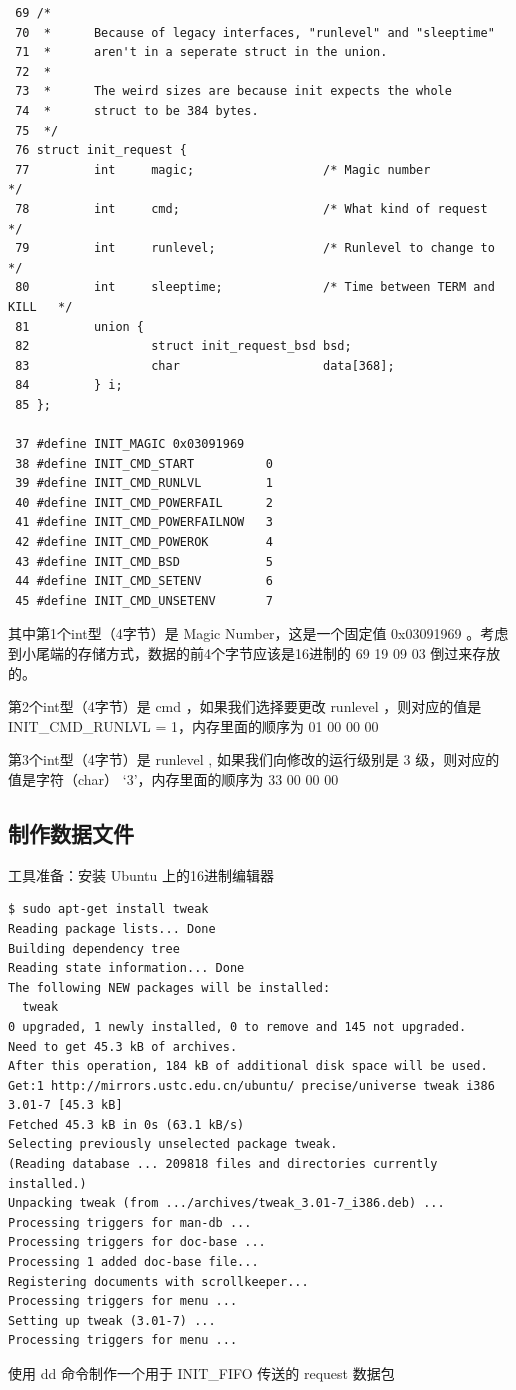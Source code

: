 {\begin{shaded}\begin{verbatim}
 69 /*
 70  *      Because of legacy interfaces, "runlevel" and "sleeptime"
 71  *      aren't in a seperate struct in the union.
 72  *
 73  *      The weird sizes are because init expects the whole
 74  *      struct to be 384 bytes.
 75  */
 76 struct init_request {
 77         int     magic;                  /* Magic number                 */
 78         int     cmd;                    /* What kind of request         */
 79         int     runlevel;               /* Runlevel to change to        */
 80         int     sleeptime;              /* Time between TERM and KILL   */
 81         union {
 82                 struct init_request_bsd bsd;
 83                 char                    data[368];
 84         } i;
 85 };

 37 #define INIT_MAGIC 0x03091969
 38 #define INIT_CMD_START          0
 39 #define INIT_CMD_RUNLVL         1
 40 #define INIT_CMD_POWERFAIL      2
 41 #define INIT_CMD_POWERFAILNOW   3
 42 #define INIT_CMD_POWEROK        4
 43 #define INIT_CMD_BSD            5
 44 #define INIT_CMD_SETENV         6
 45 #define INIT_CMD_UNSETENV       7
\end{verbatim}\end{shaded}}
其中第1个int型（4字节）是 Magic Number，这是一个固定值 0x03091969
。考虑到小尾端的存储方式，数据的前4个字节应该是16进制的 69 19 09 03
倒过来存放的。

第2个int型（4字节）是 cmd ，如果我们选择要更改 runlevel ，则对应的值是
INIT\_CMD\_RUNLVL = 1，内存里面的顺序为 01 00 00 00

第3个int型（4字节）是 runlevel , 如果我们向修改的运行级别是 3
级，则对应的值是字符（char） `3'，内存里面的顺序为 33 00 00 00

\subsection{制作数据文件}

工具准备：安装 Ubuntu 上的16进制编辑器

{\begin{shaded}\begin{verbatim}
$ sudo apt-get install tweak 
Reading package lists... Done
Building dependency tree       
Reading state information... Done
The following NEW packages will be installed:
  tweak
0 upgraded, 1 newly installed, 0 to remove and 145 not upgraded.
Need to get 45.3 kB of archives.
After this operation, 184 kB of additional disk space will be used.
Get:1 http://mirrors.ustc.edu.cn/ubuntu/ precise/universe tweak i386 3.01-7 [45.3 kB]
Fetched 45.3 kB in 0s (63.1 kB/s)                       
Selecting previously unselected package tweak.
(Reading database ... 209818 files and directories currently installed.)
Unpacking tweak (from .../archives/tweak_3.01-7_i386.deb) ...
Processing triggers for man-db ...
Processing triggers for doc-base ...
Processing 1 added doc-base file...
Registering documents with scrollkeeper...
Processing triggers for menu ...
Setting up tweak (3.01-7) ...
Processing triggers for menu ...
\end{verbatim}\end{shaded}}
使用 dd 命令制作一个用于 INIT\_FIFO 传送的 request 数据包

